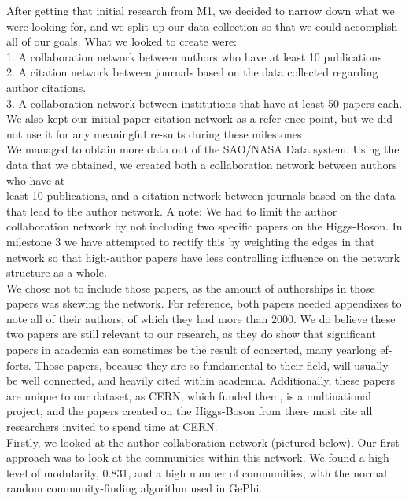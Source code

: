 \documentclass[times, 10pt,twocolumn]{article}
\begin{document}
After getting that initial research from M1, we decided to narrow down what we were looking for, and we split up our data collection so that we could accomplish all of our goals. What we looked to create were: \\
1. A collaboration network between authors who have at least 10 publications \\
2. A citation network between journals based on the data collected regarding author citations.\\
3. A collaboration network between institutions that have at least 50 papers each.\\
We also kept our initial paper citation network as a refer-ence point, but we did not use it for any meaningful re-sults during these milestones \\
We managed to obtain more data out of the SAO/NASA Data system. Using the data that we obtained, we created both a collaboration network between authors who have at\\
 least 10 publications, and a citation network between journals based on the data that lead to the author network. A note: We had to limit the author collaboration network by not including two specific papers on the Higgs-Boson. In milestone 3 we have attempted to rectify this by weighting the edges in that network so that high-author papers have less controlling influence on the network structure as a whole. \\
We chose not to include those papers, as the amount of authorships in those papers was skewing the network. For reference, both papers needed appendixes to note all of their authors, of which they had more than 2000. We do believe these two papers are still relevant to our research, as they do show that significant papers in academia can sometimes be the result of concerted, many yearlong ef-forts. Those papers, because they are so fundamental to their field, will usually be well connected, and heavily cited within academia. Additionally, these papers are unique to our dataset, as CERN, which funded them, is a multinational project, and the papers created on the Higgs-Boson from there must cite all researchers invited to spend time at CERN.\\
Firstly, we looked at the author collaboration network (pictured below). Our first approach was to look at the communities within this network. We found a high level of modularity, 0.831, and a high number of communities, with the normal random community-finding algorithm used in GePhi. \\
\end{document}
